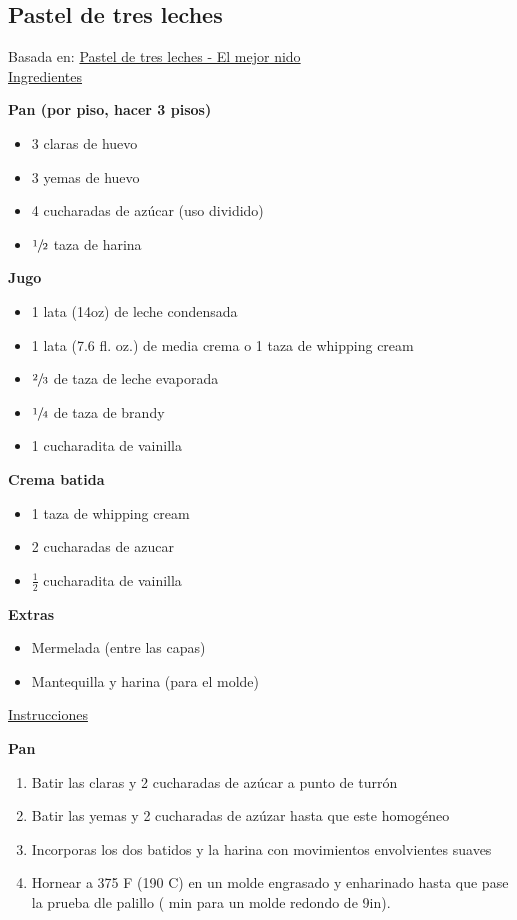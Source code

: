 \subsection{Pastel de tres leches}

Basada en: \href{https://www.elmejornido.com/es/recetas/pastel-tres-leches-121630}{Pastel de tres leches - El mejor nido}\\

\underline{Ingredientes}

\textbf{Pan (por piso, hacer 3 pisos)}

\begin{itemize}
\item 3 claras de huevo
\item 3 yemas de huevo
\item 4 cucharadas de az\'ucar (uso dividido)
\item $\sfrac{1}{2}$ taza de harina 
\end{itemize}

\textbf{Jugo}

\begin{itemize}
\item 1 lata (14oz) de leche condensada
\item 1 lata (7.6 fl. oz.) de media crema o 1 taza de whipping cream
\item $\sfrac{2}{3}$ de taza de leche evaporada
\item $\sfrac{1}{4}$ de taza de brandy
\item 1 cucharadita de vainilla
\end{itemize}

\textbf{Crema batida}

\begin{itemize}
\item 1 taza de whipping cream
\item 2 cucharadas de azucar
\item $\frac{1}{2}$ cucharadita de vainilla
\end{itemize}

\textbf{Extras}
\begin{itemize}
\item Mermelada (entre las capas)
\item Mantequilla y harina (para el molde)
\end{itemize}

\underline{Instrucciones}

\textbf{Pan}
\begin{enumerate}
\item Batir las claras y 2 cucharadas de az\'ucar a punto de turrón
\item Batir las yemas y 2 cucharadas de az\'uzar hasta que este homog\'eneo
\item Incorporas los dos batidos y la harina con movimientos envolvientes suaves
\item Hornear a 375 F (190 C) en un molde engrasado y enharinado hasta que pase la prueba dle palillo ( min para un molde redondo de 9in).
\end{enumerate}

